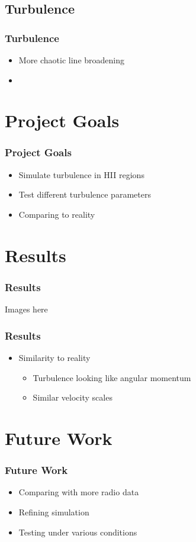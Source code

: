\documentclass[aspectratio=169,compress]{beamer}
\begin{document}
\subsection{Turbulence}
\begin{frame}
  \frametitle{Turbulence}
  \begin{itemize}
    \item More chaotic line broadening
    \item 
  \end{itemize}
\end{frame}

\section{Project Goals}
\begin{frame}
  \frametitle{Project Goals}
  \begin{itemize}
    \item Simulate turbulence in HII regions
    \item Test different turbulence parameters
    \item Comparing to reality
  \end{itemize}
\end{frame}

\section{Results}
\begin{frame}
  \frametitle{Results}
  Images here
\end{frame}

\begin{frame}
  \frametitle{Results}
  \begin{itemize}
    \item Similarity to reality
      \begin{itemize}
        \item Turbulence looking like angular momentum
        \item Similar velocity scales
      \end{itemize}
  \end{itemize}
\end{frame}

\section{Future Work}
\begin{frame}
  \frametitle{Future Work}
  \begin{itemize}
    \item Comparing with more radio data
    \item Refining simulation
    \item Testing under various conditions
  \end{itemize}
\end{frame}
\end{document}
